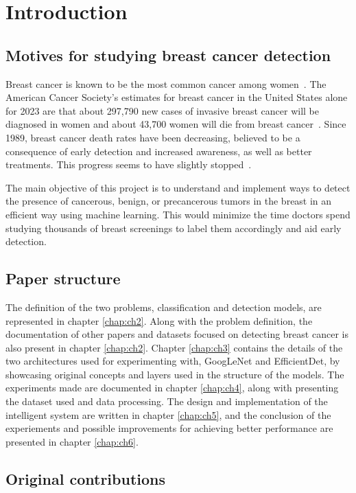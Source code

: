 \chapter{Introduction}
\label{intro}

\section{Motives for studying breast cancer detection}


Breast cancer is known to be the most common cancer among women~\cite{link1}. The American Cancer Society’s estimates for breast cancer in the United States alone for 2023 are that about 297,790 new cases of invasive breast cancer will be diagnosed in women and about 43,700 women will die from breast cancer~\cite{link2}. Since 1989, breast cancer death rates have been decreasing, believed to be a consequence of early detection and increased awareness, as well as better treatments. This progress seems to have slightly stopped~\cite{link2}.

The main objective of this project is to understand and implement ways to detect the presence of cancerous, benign, or precancerous tumors in the breast in an efficient way using machine learning. This would minimize the time doctors spend studying thousands of breast screenings to label them accordingly and aid early detection.

\section{Paper structure}

The definition of the two problems, classification and detection models, are represented in chapter \ref{chap:ch2}. Along with the problem definition, the documentation of other papers and datasets focused on detecting breast cancer is also present in chapter \ref{chap:ch2}. Chapter \ref{chap:ch3} contains the details of the two architectures used for experimenting with, GoogLeNet and EfficientDet, by showcasing original concepts and layers used in the structure of the models. The experiments made are documented in chapter \ref{chap:ch4}, along with presenting the dataset used and data processing. The design and implementation of the intelligent system are written in chapter \ref{chap:ch5}, and the conclusion of the experiements and possible improvements for achieving better performance are presented in chapter \ref{chap:ch6}.

\section{Original contributions}

